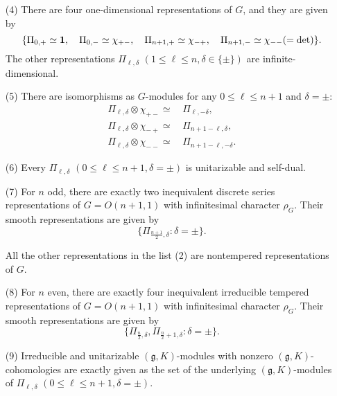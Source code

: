 \begin{theorem}
\begin{enumerate}
\item[{\rm{(4)}}]
There are four one-dimensional representations of $G$, 
 and they are given by 
\begin{equation*}
\{
  \Pi_{0,+} \simeq {\bf{1}}, \quad \Pi_{0,-} \simeq \chi_{+-}, 
\quad
   \Pi_{n+1,+} \simeq \chi_{-+}, \quad 
   \Pi_{n+1,-} \simeq \chi_{--} (=\det)
\}.  
\end{equation*}
The other representations $\Pi_{\ell,\delta}$
 $(1 \le \ell \le n, \delta \in \{\pm\})$
 are infinite-dimensional.  
\item[{\rm{(5)}}]
There are isomorphisms as $G$-modules
 for any $0 \le \ell \le n+1$ and $\delta = \pm$:
\begin{align*}
   \Pi_{\ell,\delta} \otimes \chi_{+-} \simeq \, & \Pi_{\ell,-\delta}, 
\\
   \Pi_{\ell,\delta} \otimes \chi_{-+} \simeq \, & \Pi_{n+1-\ell,\delta}, 
\\   
   \Pi_{\ell,\delta} \otimes \chi_{--} \simeq \, & \Pi_{n+1-\ell,-\delta}.  
\end{align*}
\item[{\rm{(6)}}]
Every $\Pi_{\ell,\delta}$ $(0 \le \ell \le n+1, \delta = \pm)$
 is unitarizable and self-dual.  
\item[{\rm{(7)}}]
For $n$ odd, 
 there are exactly two inequivalent 
discrete series representations
 of $G=O(n+1,1)$ with infinitesimal character $\rho_G$.  
Their smooth representations
 are given by 
\[
  \{
   \Pi_{\frac {n+1}{2},\delta}
   :
    \delta = \pm
  \}.  
\]

\par
All the other representations in the list (2)
 are nontempered representations of $G$.  
\item[{\rm{(8)}}]
For $n$ even, 
 there are exactly four inequivalent irreducible
 tempered representations of $G=O(n+1,1)$
 with infinitesimal character $\rho_G$.  
Their smooth representations are given by 
\[
  \{
   \Pi_{\frac {n}{2},\delta}, \Pi_{\frac {n}{2}+1,\delta}
   :
    \delta = \pm
  \}.  
\]
\item[{\rm{(9)}}]
Irreducible and unitarizable $({\mathfrak {g}}, K)$-modules
 with nonzero $({\mathfrak {g}}, K)$-cohomologies are
 exactly given as the set
 of the underlying $({\mathfrak {g}}, K)$-modules of $\Pi_{\ell, \delta}$
 $(0 \le \ell \le n+1, \delta = \pm)$.  
\end{enumerate}
\end{theorem}

